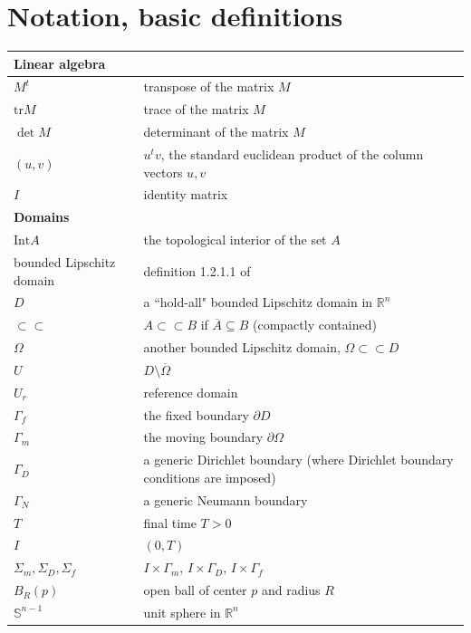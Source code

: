 \documentclass[english,a4paper,9pt,oneside]{scrbook}	%
\theoremstyle{break}
\theoremstyle{remark}
\newcommand{\mR}{\mathbb{R}}
\newcommand{\mS}{\mathbb{S}^{n-1}}
\newcommand{\tr}{\text{tr}}
\newcommand{\cc}{\subset\subset}
\begin{document}
\chapter*{Notation, basic definitions}
\begin{longtable}{|l|l|}
\hline

\multicolumn{2}{|l|}{\textbf{Linear algebra}}    \\ 
\hline
$M^t$ & transpose of the matrix $M$                \\ 
\hline
$\tr M $ & trace of the matrix $M$                \\ 
\hline
$\det M $ & determinant of the matrix $M$                \\ 
\hline
$(u,v)$ & $u^tv$, the standard euclidean product of the column vectors $u,v$                       \\ 
\hline 
$I$ & identity matrix                       \\ 
\hline 

\multicolumn{2}{|l|}{\textbf{Domains}}    \\ 
\hline
$\text{Int}A$ & the topological interior of the set $A$                \\ 
\hline
bounded Lipschitz domain & definition 1.2.1.1 of \cite{grisvard}                     \\ 
\hline
$D$ & a ``hold-all" bounded Lipschitz domain in $\mR^n$ \\ 
\hline
$\cc$ & $A\cc B$ if $\overline{A} \subseteq B$ (compactly contained)                       \\ 
\hline
$\Omega$ & another bounded Lipschitz domain, $\Omega \cc D$                \\ 
\hline
$U$ & $D\setminus \overline{\Omega}$                \\ 
\hline
$U_r$ & reference domain                \\ 
\hline
$\Gamma_f$ & the fixed boundary $\partial D$                \\ 
\hline
$\Gamma_m$ & the moving boundary $\partial \Omega$                \\ 
\hline
$\Gamma_D$ & a generic Dirichlet boundary (where Dirichlet boundary conditions are imposed)                \\
\hline
$\Gamma_N$ & a generic Neumann boundary                \\  
\hline
$T$ & final time $T>0$                \\  
\hline
$I$ & $(0,T)$                \\  
\hline
$\Sigma_m, \Sigma_D, \Sigma_f$ & $I\times \Gamma_m$, $I\times \Gamma_D$, $I\times \Gamma_f$                \\  
\hline
$B_R(p)$ & open ball of center $p$ and radius $R$                \\  
\hline
$\mS$ & unit sphere in $\mR^n$                \\  
\hline



\end{longtable}
\end{document}
